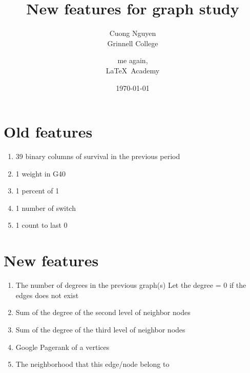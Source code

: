 \documentclass[12pt]{article}
\begin{document}



\title{\textbf{New features for graph study}}
  \date{\today}
  \author{Cuong Nguyen\\ Grinnell College \and me again, \\ \LaTeX\ Academy}
  \vspace*{-30pt}
  {\let\newpage\relax\maketitle}
\maketitle

\section*{Old features} 

\begin{enumerate}
  \item 39 binary columns of survival in the previous period
  \item 1 weight in G40
  \item 1 percent of 1
  \item 1 number of switch
  \item 1 count to last 0
\end{enumerate}


\section*{New features}

\begin{enumerate}
  \item The number of degrees in the previous graph(s)
    Let the degree = 0 if the edges does not exist  
  \item Sum of the degree of the second level of neighbor nodes
  \item Sum of the degree of the third level of neighbor nodes
  \item Google Pagerank of a vertices
  \item The neighborhood that this edge/node belong to
  
\end{enumerate}
\end{document}
